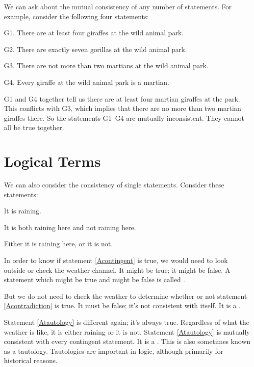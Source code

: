 \documentclass[PHIL101-Textbook.tex]{subfiles}
\begin{document}
We can ask about the mutual consistency of any number of statements. For example, consider the following four statements:
	\begin{ebullet}	
		\item[G1.] \label{MartianGiraffes} There are at least four giraffes at the wild animal park.
		\item[G2.] There are exactly seven gorillas at the wild animal park.
		\item[G3.] There are not more than two martians at the wild animal park.
		\item[G4.] Every giraffe at the wild animal park is a martian.
	\end{ebullet}
G1 and G4 together tell us there are at least four martian giraffes at the park. This conflicts with G3, which implies that there are no more than two martian giraffes there. So the statements G1--G4 are mutually inconsistent. They cannot all be true together. 

\section{Logical Terms}

We can also consider the consistency of single statements. Consider these statements:
	\begin{earg}
		\item[\ex{Acontingent}] It is raining.
		\item[\ex{Acontradiction}] It is both raining here and not raining here.
		\item[\ex{Atautology}] Either it is raining here, or it is not.
	\end{earg}
In order to know if statement \ref{Acontingent} is true, we would need to look outside or check the weather channel. It might be true; it might be false. A statement which might be true and might be false is called .


But we do not need to check the weather to determine whether or not statement \ref{Acontradiction} is true. It must be false; it's not consistent with itself. It is a .



Statement \ref{Atautology} is different again; it's always true. Regardless of what the weather is like, it is either raining or it is not. Statement \ref{Atautology} is mutually consistent with every contingent statement. It is a . This is also sometimes known as a tautology. Tautologies are important in logic, although primarily for historical reasons.
\end{document}

